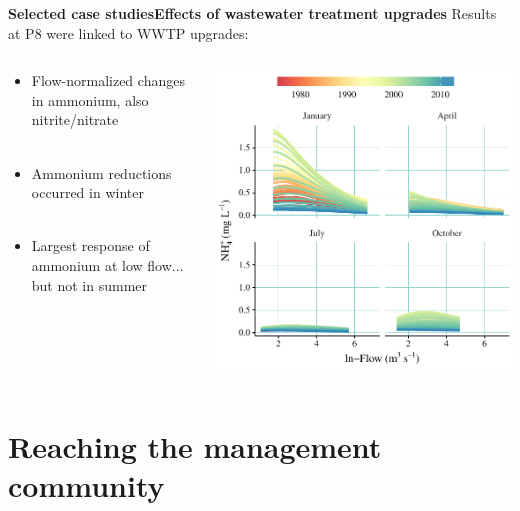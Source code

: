\documentclass[serif]{beamer}\usepackage[]{graphicx}\usepackage[]{color}
\begin{document}
\begin{frame}{\textbf{Selected case studies}}{\textbf{Effects of wastewater treatment upgrades}}
Results at P8 were linked to WWTP upgrades:
\begin{columns}
\begin{column}{0.45\textwidth}
\begin{itemize}
\item Flow-normalized changes in ammonium, also nitrite/nitrate \\~\\
\item Ammonium reductions occurred in winter \\~\\
\item Largest response of ammonium at low flow... but not in summer
\end{itemize}
\end{column}
\begin{column}{0.4\textwidth}
\vspace{0.3in}
\centerline{\includegraphics[width = \textwidth]{fig/p8dyna_thumb.pdf}}
\end{column}
\end{columns}
\end{frame}

\section{Reaching the management community}
\end{document}
